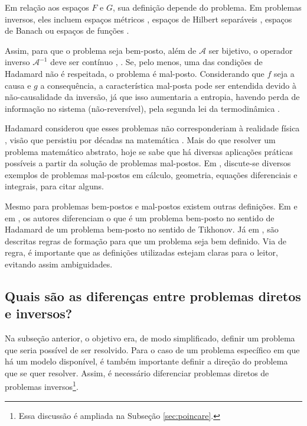 Em relação aos espaços $F$ e $G$, sua definição depende do problema. Em problemas inversos, eles incluem espaços métricos \cite[págs. 27-8]{tikhonov1977solutions}, espaços de Hilbert separáveis \cite[pág. 7]{kaipio2005statistical}, espaços de Banach \cite[pág. 27]{bleyer2015novel} ou espaços de funções \cite[pág. 1]{Nair2009}. 


Assim, para que o problema seja bem-posto, além de $\mathcal{A}$ ser bijetivo, o operador inverso $\mathcal{A}^{-1}$ deve ser contínuo \cite[Definição 1]{Chen2002}, \cite[Subseção 3.3]{Mueller2012}. Se, pelo menos, uma das condições de Hadamard não é respeitada, o problema é mal-posto. Considerando que $f$ seja a causa e $g$ a consequência, a característica mal-posta pode ser entendida devido à não-causalidade da inversão, já que isso aumentaria a entropia, havendo perda de informação no sistema (não-reversível), pela segunda lei da termodinâmica \cite[pág. 2]{Calvetti2018a}.


Hadamard considerou que esses problemas não corresponderiam à realidade física \cite[pág. 2]{hansen2010discrete}, visão que persistiu por décadas na matemática \cite[Subseção 3.6.2]{Courant1989}. Mais do que resolver um problema matemático abstrato, hoje se sabe que há diversas aplicações práticas possíveis a partir da solução de problemas mal-postos. Em \cite{Kabanikhin2008}, discute-se diversos exemplos de problemas mal-postos em cálculo, geometria, equações diferenciais e integrais, para citar alguns.
 
Mesmo para problemas bem-postos e mal-postos existem outras definições. Em \cite[Capítulos 5 e 6]{Serovaiskii2003} e em \cite[Capítulos 1 e 2]{Dontchev1993}, os autores diferenciam o que é um problema bem-posto no sentido de Hadamard de um problema bem-posto no sentido de Tikhonov. Já em \cite[Subseção 1.5]{Bunge2019}, são descritas regras de formação para que um problema seja bem definido. Via de regra, é importante que as definições utilizadas estejam claras para o leitor, evitando assim ambiguidades. 


\subsection{Quais são as diferenças entre problemas diretos e inversos?}\label{sec:forwardp}

Na subseção anterior, o objetivo era, de modo simplificado, definir um problema que seria possível de ser resolvido. Para o caso de um problema específico em que há um modelo disponível, é também importante definir a direção do problema que se quer resolver. Assim, é necessário diferenciar problemas diretos de problemas inversos\footnote{Essa discussão é ampliada na Subseção \ref{sec:poincare}.}. 

